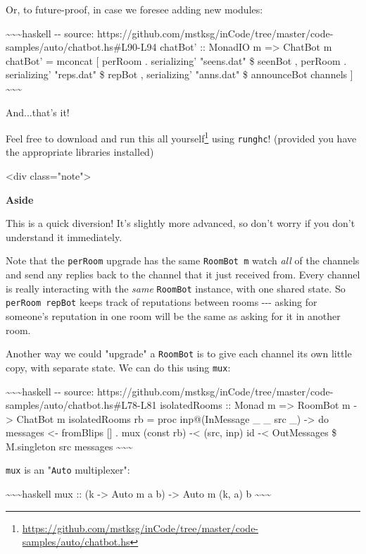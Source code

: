 \documentclass[]{article}
\renewcommand{\href}[2]{#2\footnote{\url{#1}}}
\begin{document}
Or, to future-proof, in case we foresee adding new modules:

\textasciitilde{}\textasciitilde{}\textasciitilde{}haskell -\/- source:
https://github.com/mstksg/inCode/tree/master/code-samples/auto/chatbot.hs\#L90-L94
chatBot' :: MonadIO m =\textgreater{} ChatBot m chatBot' = mconcat {[} perRoom .
serializing' "seens.dat" \$ seenBot , perRoom . serializing' "reps.dat" \$
repBot , serializing' "anns.dat" \$ announceBot channels {]}
\textasciitilde{}\textasciitilde{}\textasciitilde{}

And...that's it!

Feel free to
\href{https://github.com/mstksg/inCode/tree/master/code-samples/auto/chatbot.hs}{download
and run this all yourself} using \texttt{runghc}! (provided you have the
appropriate libraries installed)

\textless{}div class="note"\textgreater{}

\textbf{Aside}

This is a quick diversion! It's slightly more advanced, so don't worry if you
don't understand it immediately.

Note that the \texttt{perRoom} upgrade has the same \texttt{RoomBot\ m} watch
\emph{all} of the channels and send any replies back to the channel that it just
received from. Every channel is really interacting with the \emph{same}
\texttt{RoomBot} instance, with one shared state. So \texttt{perRoom\ repBot}
keeps track of reputations between rooms -\/-\/- asking for someone's reputation
in one room will be the same as asking for it in another room.

Another way we could "upgrade" a \texttt{RoomBot} is to give each channel its
own little copy, with separate state. We can do this using \texttt{mux}:

\textasciitilde{}\textasciitilde{}\textasciitilde{}haskell -\/- source:
https://github.com/mstksg/inCode/tree/master/code-samples/auto/chatbot.hs\#L78-L81
isolatedRooms :: Monad m =\textgreater{} RoomBot m -\textgreater{} ChatBot m
isolatedRooms rb = proc inp@(InMessage \_ \_ src \_) -\textgreater{} do messages
\textless{}- fromBlips {[}{]} . mux (const rb) -\textless{} (src, inp) id
-\textless{} OutMessages \$ M.singleton src messages
\textasciitilde{}\textasciitilde{}\textasciitilde{}

\texttt{mux} is an "\texttt{Auto} multiplexer":

\textasciitilde{}\textasciitilde{}\textasciitilde{}haskell mux :: (k
-\textgreater{} Auto m a b) -\textgreater{} Auto m (k, a) b
\textasciitilde{}\textasciitilde{}\textasciitilde{}
\end{document}
